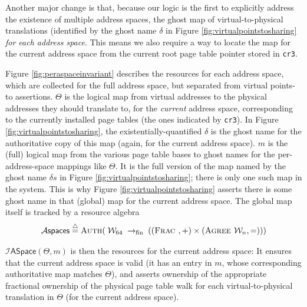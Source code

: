 Another major change is that, because our logic is the first to explicitly address the existence of multiple address spaces,
the ghost map of virtual-to-physical translations (identified by the ghost name $\delta$ in Figure \ref{fig:virtualpointstosharing}
 \emph{for each address space}. This means we also require a way to locate the map for the current address space
from the current root page table pointer stored in \lstinline|cr3|.

Figure \ref{fig:peraspaceinvariant} describes the resources for each address space, which are collected
for the full address space, but separated from virtual points-to assertions.
$\Theta$ is the logical map from virtual addresses to the physical addresses they should translate to, 
for the \emph{current} address space, corresponding to the currently installed page tables (the ones
indicated by \lstinline|cr3|). In Figure \ref{fig:virtualpointstosharing}, the existentially-quantified $\delta$
is the ghost name for the authoritative copy of this map (again, for the current address space).
$m$ is the (full) logical map from the various page table bases to ghost names for the 
per-address-space mappings like $\Theta$.
It is the full version of the map named by the ghost name $\delta{}s$ in
Figure \ref{fig:virtualpointstosharing}; there is only one such map in the system.
This is why Figure \ref{fig:virtualpointstosharing} asserts there is some ghost name in that (global) map
for the current address space.
The global map itself is tracked by a resource algebra 
\[\mathcal{A}\textsf{spaces} \stackrel{\triangle}{=} \textsc{Auth} (\; \mathcal{W}_{64} \;\rightarrow_{\textrm{fin}} \;  ( (\textsc{Frac }, \mathord{+}) \times (\textsc{Agree } \mathcal{W}_n,\mathord{=}) )) \]


$\mathcal{I}\textsf{ASpace}(\Theta,m)$ is then the resources for the current address space:
It ensures that the current address space is valid (it has an entry in $m$, whose corresponding
authoritative map matches $\Theta$), and asserts ownership of the appropriate fractional ownership
of the physical page table walk for each virtual-to-physical translation in $\Theta$ (for the current address space).



